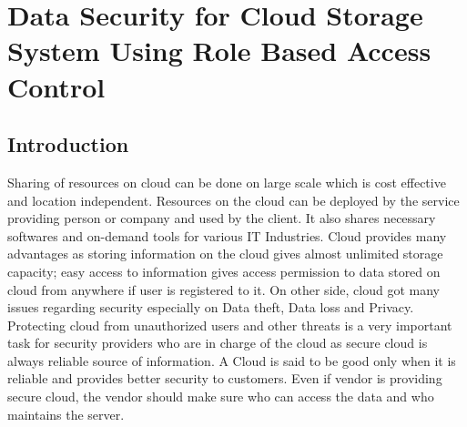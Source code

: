 \documentclass[11pt,a4paper]{report}
\begin{document}
\chapter{Data Security for Cloud Storage System Using Role Based Access Control}
\section{Introduction}
Sharing of resources on cloud can be done on large scale which is cost effective and location independent. Resources on the cloud can be deployed by the service providing person or company and used by the client.
It also shares necessary softwares and on-demand tools for various IT Industries. 
Cloud provides many advantages as storing information on the cloud gives almost unlimited storage capacity;
easy access to information gives access permission to data stored on cloud from anywhere if user is registered to it.
On other side, cloud got many issues regarding security especially on Data theft, Data loss and Privacy.
Protecting cloud from unauthorized users and other threats is a very important task for security providers who are in charge of the cloud as secure cloud is always reliable source of information.
A Cloud is said to be good only when it is reliable and provides better security to customers. Even if vendor is providing secure cloud, the vendor should make sure who can access the data and who maintains the server.
\end{document}
